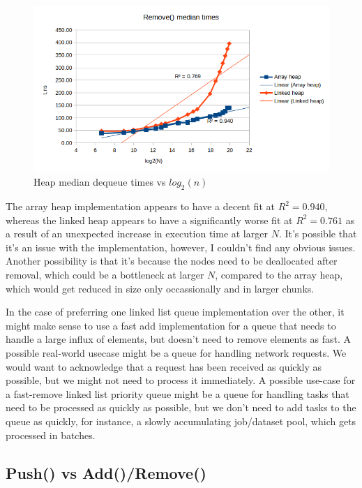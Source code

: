 \documentclass[a4paper,11pt]{article}
\begin{document}
    \begin{figure}[H]
        \centering
        \includegraphics[width=\textwidth]{complexity.png}
        \caption{Heap median dequeue times vs $log_2{(n)}$}
        \label{fig:complexity}
    \end{figure}

    The array heap implementation appears to have a decent fit at $R^2=0.940$, whereas the linked heap appears to have a significantly worse fit at $R^2=0.761$ as a result of an unexpected increase in execution time at larger $N$. It's possible that it's an issue with the implementation, however, I couldn't find any obvious issues. Another possibility is that it's because the nodes need to be deallocated after removal, which could be a bottleneck at larger $N$, compared to the array heap, which would get reduced in size only occassionally and in larger chunks.

    In the case of preferring one linked list queue implementation over the other, it might make sense to use a fast add implementation for a queue that needs to handle a large influx of elements, but doesn't need to remove elements as fast. A possible real-world usecase might be a queue for handling network requests. We would want to acknowledge that a request has been received as quickly as possible, but we might not need to process it immediately. A possible use-case for a fast-remove linked list priority queue might be a queue for handling tasks that need to be processed as quickly as possible, but we don't need to add tasks to the queue as quickly, for instance, a slowly accumulating job/dataset pool, which gets processed in batches.

    \subsection*{Push() vs Add()/Remove()}
\end{document}
